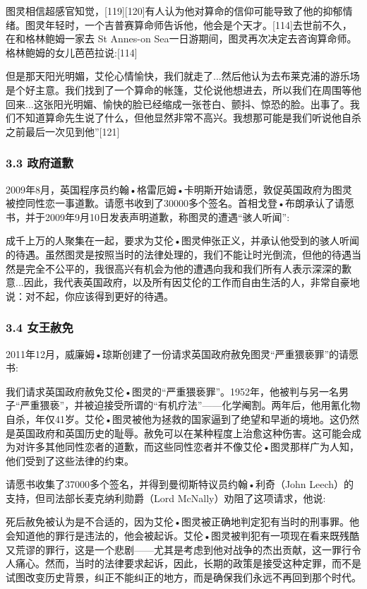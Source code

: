图灵相信超感官知觉，[119][120]有人认为他对算命的信仰可能导致了他的抑郁情绪。图灵年轻时，一个吉普赛算命师告诉他，他会是个天才。[114]去世前不久，在和格林鲍姆一家去 St Annes-on Sea一日游期间，图灵再次决定去咨询算命师。格林鲍姆的女儿芭芭拉说:[114]

但是那天阳光明媚，艾伦心情愉快，我们就走了...然后他认为去布莱克浦的游乐场是个好主意。我们找到了一个算命的帐篷，艾伦说他想进去，所以我们在周围等他回来...这张阳光明媚、愉快的脸已经缩成一张苍白、颤抖、惊恐的脸。出事了。我们不知道算命先生说了什么，但他显然非常不高兴。我想那可能是我们听说他自杀之前最后一次见到他”[121]
\subsubsection{3.3 政府道歉}
2009年8月，英国程序员约翰•格雷厄姆•卡明斯开始请愿，敦促英国政府为图灵被控同性恋一事道歉。请愿书收到了30000多个签名。首相戈登•布朗承认了请愿书，并于2009年9月10日发表声明道歉，称图灵的遭遇“骇人听闻”:

成千上万的人聚集在一起，要求为艾伦•图灵伸张正义，并承认他受到的骇人听闻的待遇。虽然图灵是按照当时的法律处理的，我们不能让时光倒流，但他的待遇当然是完全不公平的，我很高兴有机会为他的遭遇向我和我们所有人表示深深的歉意...因此，我代表英国政府，以及所有因艾伦的工作而自由生活的人，非常自豪地说：对不起，你应该得到更好的待遇。
\subsubsection{3.4 女王赦免}
2011年12月，威廉姆•琼斯创建了一份请求英国政府赦免图灵“严重猥亵罪”的请愿书:

我们请求英国政府赦免艾伦•图灵的“严重猥亵罪”。1952年，他被判与另一名男子“严重猥亵”，并被迫接受所谓的“有机疗法”——化学阉割。两年后，他用氰化物自杀，年仅41岁。艾伦•图灵被他为拯救的国家逼到了绝望和早逝的境地。这仍然是英国政府和英国历史的耻辱。赦免可以在某种程度上治愈这种伤害。这可能会成为对许多其他同性恋者的道歉，而这些同性恋者并不像艾伦•图灵那样广为人知，他们受到了这些法律的约束。

请愿书收集了37000多个签名，并得到曼彻斯特议员约翰•利奇（John Leech）的支持，但司法部长麦克纳利勋爵（Lord McNally）劝阻了这项请求，他说:

死后赦免被认为是不合适的，因为艾伦•图灵被正确地判定犯有当时的刑事罪。他会知道他的罪行是违法的，他会被起诉。艾伦•图灵被判犯有一项现在看来既残酷又荒谬的罪行，这是一个悲剧——尤其是考虑到他对战争的杰出贡献，这一罪行令人痛心。然而，当时的法律要求起诉，因此，长期的政策是接受这种定罪，而不是试图改变历史背景，纠正不能纠正的地方，而是确保我们永远不再回到那个时代。

